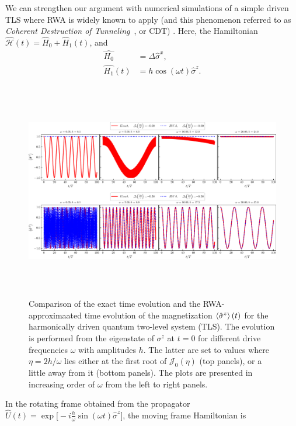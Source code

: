 \documentclass[aps,prb,reprint,showpacs,floatfix,superscriptaddress, onecolumn, 9pt]{revtex4-2}
\newcommand{\ar}[1]{{\color{blue}#1}} %
\begin{document}
\begin{enumerate}
{     We can strengthen our argument with numerical simulations of a simple driven TLS  where RWA is widely known to apply (and this phenomenon referred to as \textit{Coherent Destruction of Tunneling}~\cite{Grossmann1991, Ashhab2007}, or CDT) . Here, the Hamiltonian $\hat{\mathcal{H}}(t) = \hat{H}_0 + \hat{H}_1(t)$, and  
    \begin{align}
    \hat{H_0} &= \Delta \hat{\sigma}^x,\nonumber \\
    \hat{H_1}(t) &= h \cos(\omega t)\hat{\sigma}^z.
    \end{align}}
 \begin{figure}[t!]
	\begin{center}
		\includegraphics[height=9.5cm]{rwa_vs_exact_w_low_n_high_frz_nfrz.pdf}
	\end{center}
	\caption[] {Comparison of the exact time evolution and the RWA-approximaated time evolution of the magnetization $\expval{\hat{\sigma}^z}(t)$ for the harmonically driven quantum two-level system (TLS). The evolution is performed from the eigenstate of $\sigma^z$ at $t=0$ for different drive frequencies $\omega$ with amplitudes $h$. The latter are set to values where $\eta=2h/\omega$ lies either at the first root of $\mathcal{J}_0(\eta)$ (top panels), or a little away from it (bottom panels). The plots are presented in increasing order of $\omega$ from the left to right panels.}
	\label{Fig:compare_exact_rwa}
\end{figure}
    \ar{In the rotating frame obtained from the propagator $\hat{U}(t) = \exp\big[-i \frac{h}{\omega} \sin(\omega t)\hat{\sigma}^z\big]$, the moving frame Hamiltonian is
    \begin{align}

\end{align}}
\end{enumerate}
\end{document}
